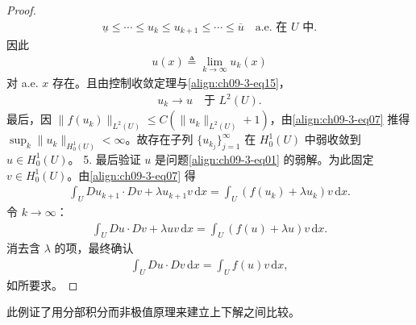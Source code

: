 \documentclass[../../main.tex]{subfiles}
\begin{document}
\begin{theorem}[上下解之间解的存在性]
\begin{proof}
\begin{align}
\underline{u}\leqslant\cdots\leqslant u_k\leqslant u_{k+1}\leqslant\cdots\leqslant\overline{u}\quad\text{a.e. 在 }U\text{ 中}.\label{align:ch09-3-eq15}
\end{align}
因此
\begin{align*}
u(x)\triangleq\lim_{k\to\infty}u_k(x)
\end{align*}
对 a.e. $x$ 存在。且由控制收敛定理与\eqref{align:ch09-3-eq15}，
\begin{align}
u_k\to u\quad\text{于 }L^2(U).\label{align:ch09-3-eq16}
\end{align}
最后，因 $\|f(u_k)\|_{L^2(U)}\leqslant C(\|u_k\|_{L^2(U)}+1)$，由\eqref{align:ch09-3-eq07} 推得 $\sup_k\|u_k\|_{H_0^1(U)}<\infty$。故存在子列 $\{u_{k_j}\}_{j=1}^\infty$ 在 $H_0^1(U)$ 中弱收敛到 $u\in H_0^1(U)$。
5. 最后验证 $u$ 是问题\eqref{align:ch09-3-eq01} 的弱解。为此固定 $v\in H_0^1(U)$。由\eqref{align:ch09-3-eq07} 得
\begin{align*}
\int_U Du_{k+1}\cdot Dv+\lambda u_{k+1}v\,\mathrm{d}x=\int_U(f(u_k)+\lambda u_k)v\,\mathrm{d}x.
\end{align*}
令 $k\to\infty$：
\begin{align*}
\int_U Du\cdot Dv+\lambda uv\,\mathrm{d}x=\int_U(f(u)+\lambda u)v\,\mathrm{d}x.
\end{align*}
消去含 $\lambda$ 的项，最终确认
\begin{align*}
\int_U Du\cdot Dv\,\mathrm{d}x=\int_U f(u)v\,\mathrm{d}x,
\end{align*}
如所要求。
\end{proof}
\end{theorem}

此例证了用分部积分而非极值原理来建立上下解之间比较。
\end{document}
